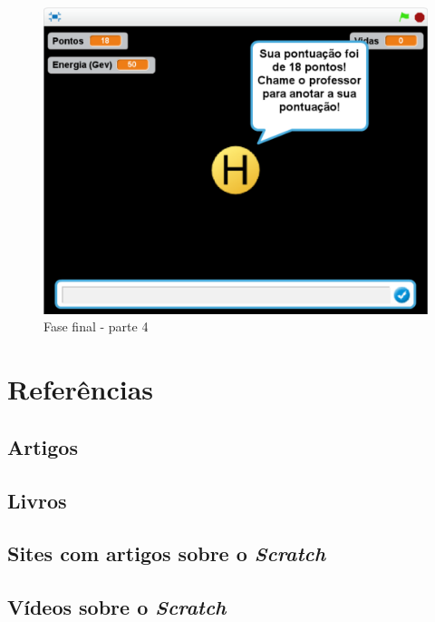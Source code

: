 \documentclass[12pt,fleqn]{book} %
\begin{document}
\begin{figure}[h]
	\centering
	\includegraphics[width=0.65 \textwidth]{Produto/final4}
	\caption{Fase final - parte 4}
	\label{fig:app_a:final4}
\end{figure}




\chapter*{Referências}
\section*{Artigos}
\printbibliography[heading=bibempty,type=article]
\section*{Livros}
\printbibliography[heading=bibempty,type=book]
\section*{Sites com artigos sobre o \textit{Scratch}}
\printbibliography[heading=bibempty,keyword=site]
\section*{Vídeos sobre o \textit{Scratch}}
\printbibliography[heading=bibempty,keyword=video]
\end{document}
